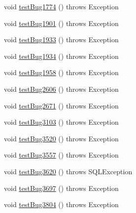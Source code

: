 \begin{DoxyCompactItemize}
\item 
void \mbox{\hyperlink{classtestsuite_1_1regression_1_1_statement_regression_test_add9e8195c4dbc3b4b95a1bc7ee5f5066}{test\+Bug1774}} ()  throws Exception 
\item 
void \mbox{\hyperlink{classtestsuite_1_1regression_1_1_statement_regression_test_aee25d7d22ab4c6ef36bab834d6dacc99}{test\+Bug1901}} ()  throws Exception 
\item 
void \mbox{\hyperlink{classtestsuite_1_1regression_1_1_statement_regression_test_a61d09502580908ecb2e973f8f3f22d51}{test\+Bug1933}} ()  throws Exception 
\item 
void \mbox{\hyperlink{classtestsuite_1_1regression_1_1_statement_regression_test_ae2d0f6ab42a969173a360bf53143ef7d}{test\+Bug1934}} ()  throws Exception 
\item 
void \mbox{\hyperlink{classtestsuite_1_1regression_1_1_statement_regression_test_a83011075c00abbedc8e7d79f2ffb6661}{test\+Bug1958}} ()  throws Exception 
\item 
void \mbox{\hyperlink{classtestsuite_1_1regression_1_1_statement_regression_test_aa53278612006c285096de5d15c6e17aa}{test\+Bug2606}} ()  throws Exception 
\item 
void \mbox{\hyperlink{classtestsuite_1_1regression_1_1_statement_regression_test_a85e39314f65a8b5de7bf5da11ed1fcad}{test\+Bug2671}} ()  throws Exception 
\item 
void \mbox{\hyperlink{classtestsuite_1_1regression_1_1_statement_regression_test_a9c642be3e679b82dbf2a033e2f09e90b}{test\+Bug3103}} ()  throws Exception 
\item 
void \mbox{\hyperlink{classtestsuite_1_1regression_1_1_statement_regression_test_a18dbb1cd4de47766732bd187315d645c}{test\+Bug3520}} ()  throws Exception 
\item 
void \mbox{\hyperlink{classtestsuite_1_1regression_1_1_statement_regression_test_addf4861dd4d40e523b54ffc88ff0e1f9}{test\+Bug3557}} ()  throws Exception 
\item 
void \mbox{\hyperlink{classtestsuite_1_1regression_1_1_statement_regression_test_aff7b0f7e5043e4a16d128d96ad607be6}{test\+Bug3620}} ()  throws S\+Q\+L\+Exception 
\item 
void \mbox{\hyperlink{classtestsuite_1_1regression_1_1_statement_regression_test_a2977c93f45f1a9ec78b20348f2d4e290}{test\+Bug3697}} ()  throws Exception 
\item 
void \mbox{\hyperlink{classtestsuite_1_1regression_1_1_statement_regression_test_aa50b1c76440598f989c311efbcc037df}{test\+Bug3804}} ()  throws Exception 

\end{DoxyCompactItemize}

